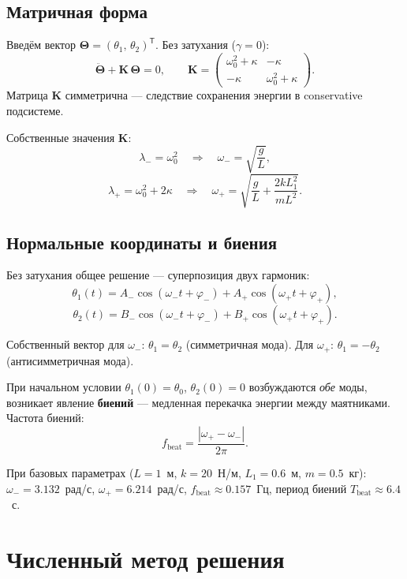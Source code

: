 \documentclass[12pt,a4paper]{article}
\begin{document}
\subsection{Матричная форма}

Введём вектор \(\boldsymbol{\Theta}=(\theta_1,\,\theta_2)^\mathsf{T}\).
Без затухания (\(\gamma=0\)):
\[
\ddot{\boldsymbol{\Theta}} + \mathbf{K}\,\boldsymbol{\Theta} = 0,
\qquad
\mathbf{K}=
\begin{pmatrix}
\omega_0^2+\kappa & -\kappa\\[2pt]
-\kappa & \omega_0^2+\kappa
\end{pmatrix}.
\]
Матрица \(\mathbf{K}\) симметрична --- следствие сохранения энергии в
conservative подсистеме.

Собственные значения \(\mathbf{K}\):
\[
\lambda_-=\omega_0^2 \quad\Rightarrow\quad \omega_-=\sqrt{\frac{g}{L}},
\]
\[
\lambda_+=\omega_0^2+2\kappa \quad\Rightarrow\quad \omega_+=\sqrt{\frac{g}{L}+\frac{2kL_1^2}{mL^2}}.
\]

\subsection{Нормальные координаты и биения}

Без затухания общее решение --- суперпозиция двух гармоник:
\[
\theta_1(t) = A_-\cos(\omega_- t+\varphi_-) + A_+\cos(\omega_+ t+\varphi_+),
\]
\[
\theta_2(t) = B_-\cos(\omega_- t+\varphi_-) + B_+\cos(\omega_+ t+\varphi_+).
\]

Собственный вектор для \(\omega_-\): \(\theta_1=\theta_2\) (симметричная мода).
Для \(\omega_+\): \(\theta_1=-\theta_2\) (антисимметричная мода).

При начальном условии \(\theta_1(0)=\theta_0\), \(\theta_2(0)=0\) возбуждаются
\emph{обе} моды, возникает явление \textbf{биений} --- медленная перекачка
энергии между маятниками. Частота биений:
\begin{equation}\label{eq:beat}
f_{\mathrm{beat}} = \frac{|\omega_+-\omega_-|}{2\pi}.
\end{equation}

При базовых параметрах (\(L=1\)~м, \(k=20\)~Н/м, \(L_1=0.6\)~м, \(m=0.5\)~кг):
\(\omega_-=3.132\)~рад/с, \(\omega_+=6.214\)~рад/с, \(f_{\mathrm{beat}}\approx0.157\)~Гц,
период биений \(T_{\mathrm{beat}}\approx6.4\)~с.

\section{Численный метод решения}
\end{document}

